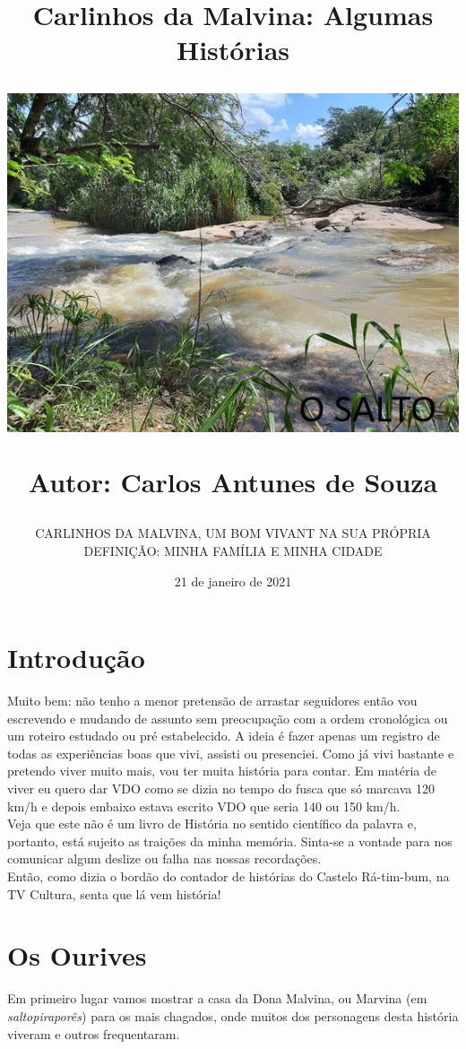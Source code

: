 \documentclass[12pt,brazil,]{book}
\title{Carlinhos da Malvina: Algumas Histórias

\includegraphics{Imagens/OSALTOB.JPEG}

Autor: Carlos Antunes de Souza}
\subtitle{CARLINHOS DA MALVINA, UM BOM VIVANT NA SUA PRÓPRIA DEFINIÇÃO: MINHA
FAMÍLIA E MINHA CIDADE}
\date{21 de janeiro de 2021}
\begin{document}
\maketitle

{
\setcounter{tocdepth}{1}
\tableofcontents
}
\chapter*{Introdução}\label{introduuxe7uxe3o}

Muito bem: não tenho a menor pretensão de arrastar seguidores então vou
escrevendo e mudando de assunto sem preocupação com a ordem cronológica
ou um roteiro estudado ou pré estabelecido. A ideia é fazer apenas um
registro de todas as experiências boas que vivi, assisti ou presenciei.
Como já vivi bastante e pretendo viver muito mais, vou ter muita
história para contar. Em matéria de viver eu quero dar VDO como se dizia
no tempo do fusca que só marcava 120 km/h e depois embaixo estava
escrito VDO que seria 140 ou 150 km/h.\\
Veja que este não é um livro de História no sentido científico da
palavra e, portanto, está sujeito as traições da minha memória. Sinta-se
a vontade para nos comunicar algum deslize ou falha nas nossas
recordações.\\
Então, como dizia o bordão do contador de histórias do Castelo
Rá-tim-bum, na TV Cultura, senta que lá vem história!

\chapter{Os Ourives}\label{os-ourives}

Em primeiro lugar vamos mostrar a casa da Dona Malvina, ou Marvina (em
\emph{saltopiraporês}) para os mais chagados, onde muitos dos
personagens desta história viveram e outros frequentaram.
\end{document}

